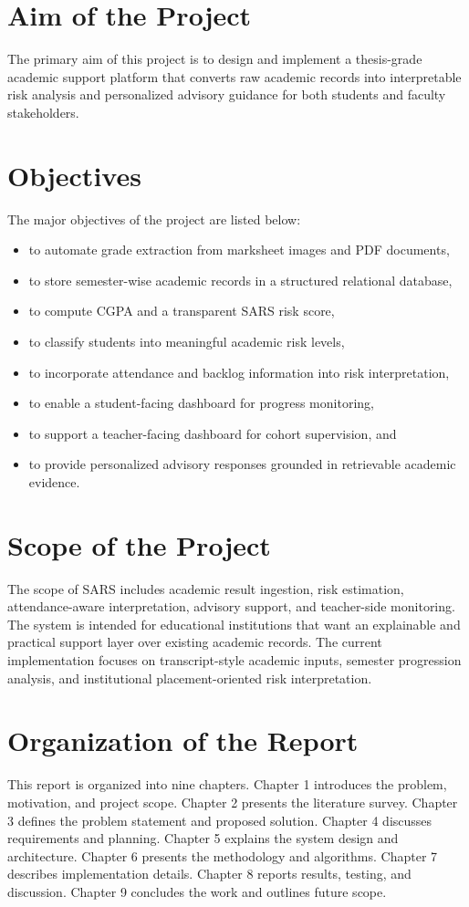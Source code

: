 \section{Aim of the Project}
The primary aim of this project is to design and implement a thesis-grade academic support platform that converts raw academic records into interpretable risk analysis and personalized advisory guidance for both students and faculty stakeholders.

\section{Objectives}
The major objectives of the project are listed below:
\begin{itemize}[leftmargin=*]
\item to automate grade extraction from marksheet images and PDF documents,
\item to store semester-wise academic records in a structured relational database,
\item to compute CGPA and a transparent SARS risk score,
\item to classify students into meaningful academic risk levels,
\item to incorporate attendance and backlog information into risk interpretation,
\item to enable a student-facing dashboard for progress monitoring,
\item to support a teacher-facing dashboard for cohort supervision, and
\item to provide personalized advisory responses grounded in retrievable academic evidence.
\end{itemize}

\section{Scope of the Project}
The scope of SARS includes academic result ingestion, risk estimation, attendance-aware interpretation, advisory support, and teacher-side monitoring. The system is intended for educational institutions that want an explainable and practical support layer over existing academic records. The current implementation focuses on transcript-style academic inputs, semester progression analysis, and institutional placement-oriented risk interpretation.

\section{Organization of the Report}
This report is organized into nine chapters. Chapter 1 introduces the problem, motivation, and project scope. Chapter 2 presents the literature survey. Chapter 3 defines the problem statement and proposed solution. Chapter 4 discusses requirements and planning. Chapter 5 explains the system design and architecture. Chapter 6 presents the methodology and algorithms. Chapter 7 describes implementation details. Chapter 8 reports results, testing, and discussion. Chapter 9 concludes the work and outlines future scope.

